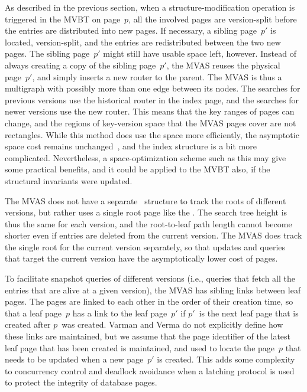 As described in the previous section, when a structure-modification operation
is triggered in the MVBT on page~$p$, all the involved pages are 
version-split before the entries are distributed into new pages.
If necessary, a sibling page~$p'$ is located, version-split, and the entries
are redistributed between the two new pages.
The sibling page~$p'$ might still have usable space left, however.
Instead of always creating a copy of the sibling page~$p'$, the MVAS reuses
the physical page~$p'$, and simply inserts a new router to the parent.
The MVAS is thus a multigraph with possibly more than one edge between its
nodes.
The searches for previous versions use the historical router in the index
page, and the searches for newer versions use the new router.
This means that the key ranges of pages can change, and the regions of
key-version space that the MVAS pages cover are not rectangles.
While this method does use the space more efficiently, the asymptotic space
cost remains unchanged~\cite{varman:1997:multiversion}, and the index
structure is a bit more complicated.
Nevertheless, a space-optimization scheme such as this may give some
practical benefits, and it could be applied to the MVBT also, if the
structural invariants were updated.

The MVAS does not have a separate \rootstar\ structure to track the roots of
different versions, but rather uses a single root page like the \TSBtree.
The search tree height is thus the same for each version, and the
root-to-leaf path length cannot become shorter even if entries are deleted
from the current version.
The MVAS does track the single root for the current version separately, so
that updates and queries that target the current version have the
asymptotically lower cost of  pages.

To facilitate snapshot queries of different versions (i.e., queries that
fetch all the entries that are alive at a given version), the MVAS has sibling
links between leaf pages.
The pages are linked to each other in the order of their creation time, so
that a leaf page~$p$ has a link to the leaf page~$p'$ if $p'$~is the
next leaf page that is created after $p$~was created.
Varman and Verma do not explicitly define how these links are maintained, but
we assume that the page identifier of the latest leaf page that has been
created is maintained, and used to locate the page~$p$ that needs to be
updated when a new page~$p'$ is created.
This adds some complexity to concurrency control and deadlock avoidance when
a latching protocol is used to protect the integrity of database pages.

